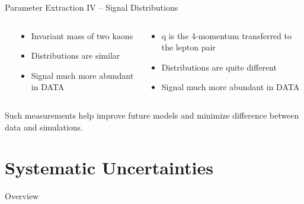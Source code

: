 \documentclass[serif]{beamer}
\begin{document}
\begin{frame}[t]{Parameter Extraction IV -- Signal Distributions}
\begin{columns}
\begin{center}
\begin{tikzpicture}
		
		\end{tikzpicture}
	\end{center}
	\begin{block}{}
		\begin{itemize}
			\item Invariant mass of two kaons
			\item Distributions are similar
			\item Signal much more abundant in DATA
		\end{itemize}
	\end{block}
\begin{block}{}
	\begin{itemize}
		\item $\mathrm{q}$ is the 4-momentum transferred to the lepton pair
		\item Distributions are quite different
		\item Signal much more abundant in DATA
	\end{itemize}
\end{block}
\end{columns}

Such measurements help improve future models and minimize difference between data and simulations. 



\end{frame}

\section{Systematic Uncertainties} 

\begin{frame}[t]{Overview}
\end{frame}

\end{document}
